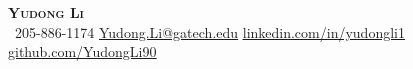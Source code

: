 \begin{center}
    \textbf{\Huge \scshape Yudong Li} \\ \vspace{1pt}
     \ \small 205-886-1174 \quad
    \href{mailto:Yudong.Li@gatech.edu}{ \underline{Yudong.Li@gatech.edu}} \quad
    \href{https://www.linkedin.com/in/yudongli1}{ \underline{linkedin.com/in/yudongli1}} \quad
    \href{https://github.com/YudongLi90}{ \underline{github.com/YudongLi90}}
\end{center}